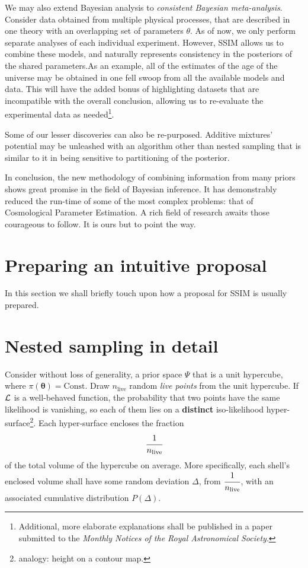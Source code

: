 \documentclass[usenatbib]{mnras}
\begin{document}
We may also extend Bayesian analysis to \emph{consistent Bayesian
  meta-analysis}. Consider data obtained from multiple physical
processes, that are described in one theory with an overlapping set of
parameters $\theta$. As of now, we only perform separate analyses of
each individual experiment. However, SSIM allows us to combine these
models, and naturally represents consistency in the posteriors of the
shared parameters.As an example, all of the estimates of the age of
the universe may be obtained in one fell swoop from all the available
models and data. This will have the added bonus of highlighting
datasets that are incompatible with the overall conclusion, allowing
us to re-evaluate the experimental data as needed\footnote{Additional,
  more elaborate explanations shall be published in a paper submitted
  to the \emph{Monthly Notices of the Royal Astronomical Society}.}.

Some of our lesser discoveries can also be re-purposed. Additive
mixtures' potential may be unleashed with an algorithm other than
nested sampling that is similar to it in being sensitive to
partitioning of the posterior.

In conclusion, the new methodology of combining information from many
priors shows great promise in the field of Bayesian inference. It has
demonstrably reduced the run-time of some of the most complex
problems: that of Cosmological Parameter Estimation. A rich field of
research awaits those courageous to follow. It is ours but to point
the way.




\appendix
\section{Preparing an intuitive proposal\label{sec:iPPR}}
In this section we shall briefly touch upon how a proposal for SSIM is
usually prepared.


\section{Nested sampling in detail}\label{sec:ns}
Consider without loss of generality, a prior space \(\Psi\) that is a
unit hypercube, where \(\pi(\bm{\theta}) = \text{Const.}\) Draw
\(n_\text{live}\) random \emph{live points} from the unit
hypercube. If \({\cal L}\) is a well-behaved function, the probability
that two points have the same likelihood is vanishing, so each of them
lies on a \textbf{distinct} iso-likelihood
hyper-surface\footnote{analogy: height on a contour map. }. Each
hyper-surface encloses the fraction
\begin{equation}
\cfrac{1}{n_\text{live}}
\end{equation}
of the total volume of the hypercube on average. More specifically,
each shell's enclosed volume shall have some random deviation \(\Delta\), from
\(\cfrac{1}{n_\text{live}}\), with an associated cumulative
distribution \(P(\Delta)\).
\end{document}
